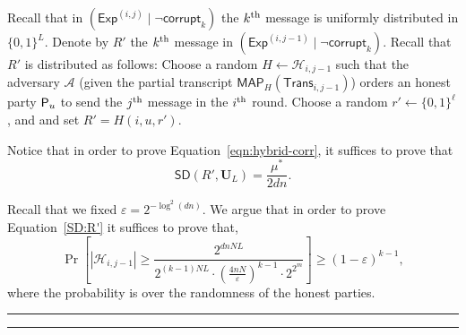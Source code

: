\documentclass[11pt]{article}
\theoremstyle{plain}
\theoremstyle{definition}
\numberwithin{equation}{section}
\newcommand{\qedsymb}{\hfill{\rule{2mm}{2mm}}}
\renewenvironment{proof}{\begin{trivlist} \item[\hspace{\labelsep}{\bf
\noindent Proof.\/}] }{\qedsymb\end{trivlist}}
\numberwithin{equation}{section} \newcommand{\aka} {also known as\ }
\newcommand{\abs}[1]{\left|#1\right|}
\newcommand{\U}{\mathbf U}
\newcommand{\Hc}{\mathcal H}
\newcommand{\B}{\{ 0,1 \}}
\def\epsilon{\varepsilon}
\newcommand{\1}{\mathbf{1}}
\newcommand{\Adv}{\mathcal A}
\newcommand{\ith}[1]{{#1}\textsuperscript{th}}
\newcommand{\SD}{\mathsf{SD}}
\newcommand{\corr}{\textsf{corrupt}_k}
\newcommand{\trans}{{\mathsf{Trans}}}
\newcommand{\Exp}{\mathsf{Exp}}
\newcommand{\MAP}{\mathsf{MAP}}
\theoremstyle{remark}
\begin{document}
\begin{proof}
\begin{proof}
Recall that in $\left(\Exp^{(i,j)}\mid \neg{\corr}\right)$ the $\ith{k}$ message is uniformly distributed in $\B^L$. Denote by $R'$ the $\ith{k}$ message in $\left(\Exp^{(i,j-1)}\mid \neg{\corr}\right)$.  Recall that $R'$ is distributed as follows:  Choose a random $H\leftarrow\Hc_{i,j-1}$ such that the adversary $\Adv$ (given the partial transcript $\MAP_H(\trans_{i,j-1})$) orders an honest party $\mathsf{P}_{{u}}$ to send the $\ith{j}$ message in the $\ith{i}$ round.  Choose a random $r'\leftarrow\{0,1\}^\ell$, and and set
$R'=H(i,u,r')$.

Notice that in order to prove Equation~\eqref{eqn:hybrid-corr}, it suffices to prove that
\begin{equation}\label{SD:R'}
\SD(R',\U_L)=\frac{\mu^*}{2dn}.
\end{equation}

Recall that we fixed $\epsilon=2^{-\log^2 (dn)}$.
We argue that in order to prove Equation~\eqref{SD:R'} it suffices to prove
that,
  \begin{equation}\label{eqn:sizeH}
    \Pr\left[\abs{\Hc_{i,j-1}}\geq\frac{2^{dnN L}}{2^{(k-1)NL}\cdot \left(\frac{4nN}{\epsilon}\right)^{k-1}\cdot 2^{2^m}}\right]\geq (1-\epsilon)^{k-1},
  \end{equation}
  where the probability is over the randomness of the honest parties.


\end{proof}
\end{proof}
\end{document}
